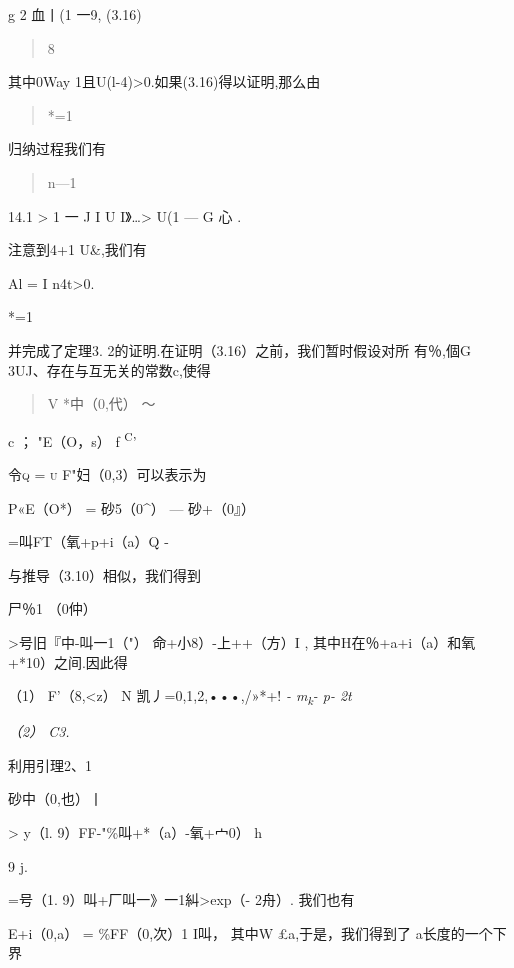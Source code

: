 \documentclass{article}
\begin{document}
\textbar{}g\textbar{} 2 \textbar{}血丨(1 一9, (3.16)

\begin{quote}
8
\end{quote}

其中0Way 1且U(l-4)\textgreater{}0.如果(3.16)得以证明,那么由

\begin{quote}
*=1
\end{quote}

归纳过程我们有

\begin{quote}
n---1
\end{quote}

14.1 \textgreater{} \textbar{}1 一 J I U I》\ldots{}\textgreater{} U(1
--- G 心 \textbar{}.

注意到4+1 U\&,我们有

Al = I n4t\textbar{}\textgreater{}0.

*=1

并完成了定理3. 2的证明.在证明（3.16）之前，我们暂时假设对所 有％,個G
3UJ、存在与互无关的常数c,使得

\begin{quote}
V {\textbar{}*中（0,代）\textbar{}} 〜
\end{quote}

c ； \textbar{}"E（O，s）\textbar{} f \textsuperscript{C}'

令\textsc{q = u} F"妇（0,3）可以表示为

\textbar{}P«E（O*）\textbar{} = \textbar{}砂5（0\^{}） ---
砂+（0』）\textbar{}

=叫FT（氧+p+i（a）Q -

与推导（3.10）相似，我们得到

\textbar{}尸％1 （0仲）\textbar{}

\textgreater{}号旧『中-叫一1（"） \textbar{}
\textbar{}命+小8）-上++（方）I , 其中H在％+a+i（a）和氧+*10）之间.因此得

（1） \textbar{}F'（8,\textless{}z） \textbar{} N 凯丿=0,1,2,•••,/»*+!
\emph{- m\textsubscript{k}- p- 2t}

\emph{（2） C3.}

利用引理2、1

\textbar{}砂中（0,也）丨

\textgreater{} y（l. 9）FF-"\%叫+*（a）-氧+宀0） h

9 j.

=号（1. 9）叫+厂叫一》一1\textbar{}糾\textgreater{}exp（- 2舟）.
我们也有

\textbar{}E+i（0,a）\textbar{} = \textbar{}\%FF（0,次）1 I叫， 其中W
£a,于是，我们得到了 a长度的一个下界
\end{document}
